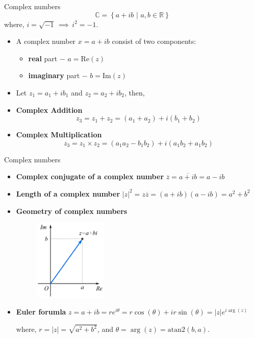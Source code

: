 \documentclass[aspectratio=169]{beamer}
\begin{document}
\begin{frame}[t]{Complex numbers}
    $$ \mathbb{C} = \left\{ a + i b \,\, \big\vert \,\, a, b \in \mathbb{R} \right\}$$
    where, $i = \sqrt{-1} \, \implies \, i^2 = -1$.
    
    \begin{itemize}
        \item A complex number $x = a + ib$ consist of two components: 
        \begin{itemize}
            \item \textbf{real} part $-$ $a = \text{Re}(z)$
            \item \textbf{imaginary} part $-$ $b = \text{Im}(z)$
        \end{itemize}
        
        \item Let  $z_1 = a_1 + ib_1$ and $z_2 = a_2 + ib_2$, then,
        
        \item \textbf{Complex Addition}
        $$ z_3 = z_1 + z_2 = (a_1 + a_2) + i (b_1 + b_2)$$

        \item \textbf{Complex Multiplication}
        $$ z_3 = z_1 \times z_2 = (a_1a_2 - b_1b_2) + i (a_1b_2 + a_1b_2)$$
        
    \end{itemize}
\end{frame}

\begin{frame}[t]{Complex numbers}
    \begin{itemize}
        \item \textbf{Complex conjugate of a complex number} $ \overline{z} = \overline{a + ib} = a - ib $

        \item \textbf{Length of a complex number} $ \vert z \vert^2 = z\overline{z} = \left(a + ib\right)\left(a - ib\right) = a^2 + b^2 $

        \item \textbf{Geometry of complex numbers}
        \begin{figure}[h]
            \centering
            \includegraphics[width=3.5cm]{figs/complane.png}
        \end{figure}
        
        \item \textbf{Euler forumla} $ z = a + ib = re^{i\theta} = r\cos(\theta) + ir\sin(\theta) = \vert z\vert e^{i\arg\left(z\right)}$

        where, $r = \vert z \vert = \sqrt{a^2 + b^2}$, and $\theta = \arg \left(z\right) = \text{atan2}(b, a)$.
    \end{itemize}
\end{frame}
\end{document}
